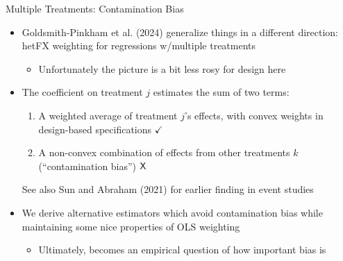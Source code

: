 \documentclass[11pt,english]{beamer}
\begin{document}
\begin{frame}{Multiple Treatments: Contamination Bias}
\begin{itemize}
\item Goldsmith-Pinkham et al. (2024) generalize things in a different direction: hetFX weighting for regressions w/multiple treatments\smallskip
\begin{itemize}
\item Unfortunately the picture is a bit less rosy for design here
\end{itemize}\bigskip\pause{}
\item The coefficient on treatment $j$ estimates the sum of two terms:\smallskip
\begin{enumerate}
\item A weighted average of treatment $j$'s effects, with convex weights in design-based specifications $\checkmark$\smallskip\pause{}
\item A non-convex combination of effects from other treatments $k$ (``contamination bias'') $\text{\sffamily X}$
\end{enumerate}\pause{}\smallskip
See also Sun and Abraham (2021) for earlier finding in event studies \bigskip\pause{}
\item We derive alternative estimators which avoid contamination bias while maintaining some nice  properties of OLS weighting\smallskip
\begin{itemize}
\item Ultimately, becomes an empirical question of how important bias is
\end{itemize}
\end{itemize}
\end{frame}
\end{document}
